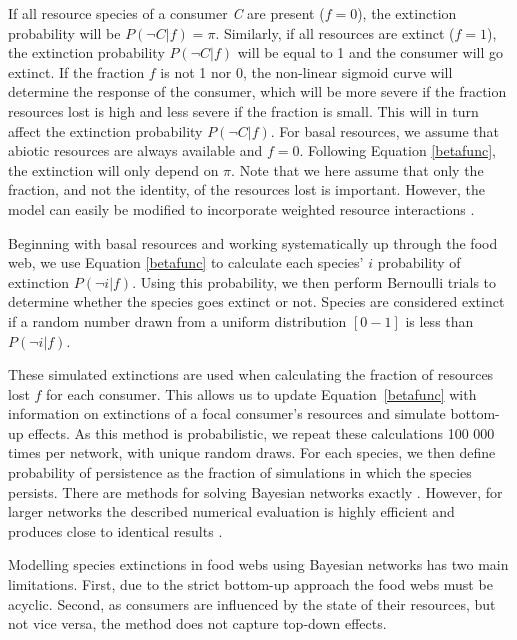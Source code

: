 \documentclass[12pt]{article}
\begin{document}
\begin{spacing}{2.0}
		If all resource species of a consumer \textit{C} are present ($f = 0$), the extinction probability will be $P(\lnot C|f) = \pi$. 
		Similarly, if all resources are extinct ($f = 1$), the extinction probability $P(\lnot C|f)$ will be equal to 1 and the consumer will go extinct.
		If the fraction $f$ is not 1 nor 0, the non-linear sigmoid curve will determine the response of the consumer, which will be more severe if the fraction resources lost is high and less severe if the fraction is small. This will in turn affect the extinction probability $P(\lnot C|f)$.
		For basal resources, we assume that abiotic resources are always available and $f=0$. Following Equation \ref{betafunc}, the extinction will only depend on $\pi$.
		Note that we here assume that only the fraction, and not the identity, of the resources lost is important. 
		However, the model can easily be modified to incorporate weighted resource interactions \citep[see][]{Eklof2013}.
		
		
        Beginning with basal resources and working systematically up through the food web, we use Equation \ref{betafunc} to calculate each species' $i$ probability of extinction $P(\lnot i|f)$.
        Using this probability, we then perform Bernoulli trials to determine whether the species goes extinct or not. 
        Species are considered extinct if a random number drawn from a uniform distribution $[0-1]$ is less than $P(\lnot i|f)$.


        These simulated extinctions are used when calculating the fraction of resources lost $f$ for each consumer.
        This allows us to update Equation~\ref{betafunc} with information on extinctions of a focal consumer's resources and simulate bottom-up effects. As this method is probabilistic, we repeat these calculations 100 000 times per network, with unique random draws.
	    For each species, we then define probability of persistence as the fraction of simulations in which the species persists. There are methods for solving Bayesian networks exactly \citep{Eklof2013}.
	    However, for larger networks the described numerical evaluation is highly efficient and produces close to identical results \citep{Haussler2020}.
		
		
		Modelling species extinctions in food webs using Bayesian networks has two main limitations. First, due to the strict bottom-up approach the food webs must be acyclic. 
		Second, as consumers are influenced by the state of their resources, but not vice versa, the method does not capture top-down effects.
		

\end{spacing}
\end{document}
